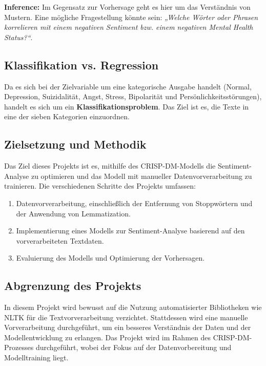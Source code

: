 \textbf{Inference:} Im Gegensatz zur Vorhersage geht es hier um das Verständnis von Mustern. Eine mögliche Fragestellung könnte sein: \textit{„Welche Wörter oder Phrasen korrelieren mit einem negativen Sentiment bzw. einem negativen Mental Health Status?“}.

\subsection{Klassifikation vs. Regression}
Da es sich bei der Zielvariable um eine kategorische Ausgabe handelt (Normal, Depression, Suizidalität, Angst, Stress, Bipolarität und Persönlichkeitsstörungen), handelt es sich um ein \textbf{Klassifikationsproblem}. Das Ziel ist es, die Texte in eine der sieben Kategorien einzuordnen.

\subsection{Zielsetzung und Methodik}
Das Ziel dieses Projekts ist es, mithilfe des CRISP-DM-Modells die Sentiment-Analyse zu optimieren und das Modell mit manueller Datenvorverarbeitung zu trainieren. Die verschiedenen Schritte des Projekts umfassen:
\begin{enumerate}
    \item Datenvorverarbeitung, einschließlich der Entfernung von Stoppwörtern und der Anwendung von Lemmatization.
    \item Implementierung eines Modells zur Sentiment-Analyse basierend auf den vorverarbeiteten Textdaten.
    \item Evaluierung des Modells und Optimierung der Vorhersagen.
\end{enumerate}

\subsection{Abgrenzung des Projekts}
In diesem Projekt wird bewusst auf die Nutzung automatisierter Bibliotheken wie NLTK für die Textvorverarbeitung verzichtet. Stattdessen wird eine manuelle Vorverarbeitung durchgeführt, um ein besseres Verständnis der Daten und der Modellentwicklung zu erlangen. Das Projekt wird im Rahmen des CRISP-DM-Prozesses durchgeführt, wobei der Fokus auf der Datenvorbereitung und Modelltraining liegt.